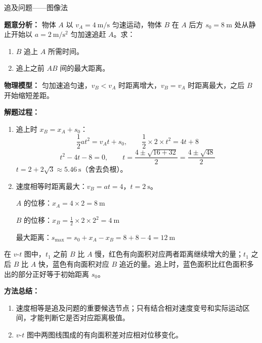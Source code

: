 \begin{examplebox}{追及问题——图像法}

\textbf{题意分析：} 物体 $A$ 以 $v_A = 4\ \mathrm{m/s}$ 匀速运动，物体 $B$ 在 $A$ 后方 $s_0 = 8\ \mathrm{m}$ 处从静止开始以 $a = 2\ \mathrm{m/s^2}$ 匀加速追赶 $A$。求：
\begin{enumerate}
  \item $B$ 追上 $A$ 所需时间。
  \item 追上之前 $AB$ 间的最大距离。
\end{enumerate}

\textbf{物理模型：} 匀加速追匀速，$v_B < v_A$ 时距离增大，$v_B = v_A$ 时距离最大，之后 $B$ 开始缩短差距。

\textbf{解题过程：}

\begin{enumerate}
  \item 追上时 $x_B = x_A + s_0$：
  \[
  \frac12 a t^2 = v_A t + s_0,\qquad
  \frac12 \times 2 \times t^2 = 4t + 8
  \]
  \[
  t^2 - 4t - 8 = 0,\qquad
  t = \frac{4 \pm \sqrt{16 + 32}}{2} = \frac{4 \pm \sqrt{48}}{2}
  \]
  $t = 2 + 2\sqrt{3} \approx 5.46\ \mathrm{s}$（舍去负根）。

  \item 速度相等时距离最大：$v_B = a t = 4$，$t = 2\ \mathrm{s}$。

  $A$ 的位移：$x_A = 4 \times 2 = 8\ \mathrm{m}$

  $B$ 的位移：$x_B = \frac12 \times 2 \times 2^2 = 4\ \mathrm{m}$

  最大距离：$s_{\max} = s_0 + x_A - x_B = 8 + 8 - 4 = 12\ \mathrm{m}$
\end{enumerate}

在 $v$-$t$ 图中，$t_1$ 之前 $B$ 比 $A$ 慢，红色有向面积对应两者距离继续增大的量；$t_1$ 之后 $B$ 比 $A$ 快，蓝色有向面积对应 $B$ 追近的量。追上时，蓝色面积比红色面积多出的部分正好等于初始距离 $s_0$。

\begin{center}


\label{fig:chase-vt}
\end{center}

\textbf{方法总结：}
\begin{enumerate}
  \item 速度相等是追及问题的重要候选节点；只有结合相对速度变号和实际运动区间，才能判断它是否对应距离极值。
  \item $v$-$t$ 图中两图线围成的有向面积差对应相对位移变化。
\end{enumerate}

\end{examplebox}

